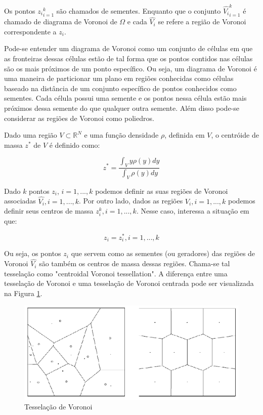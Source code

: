 Os pontos ${z_i}_{i=1}^k$ são chamados de sementes. Enquanto que o conjunto ${\hat{V_i}}_{i=1}^k$ é chamado de diagrama de Voronoi de $\Omega$ e cada $\hat{V_i}$ se refere a região de Voronoi correspondente a $z_i$.

Pode-se entender um diagrama de Voronoi como um conjunto de células em que as fronteiras dessas células estão de tal forma que os pontos contidos nas células são os mais próximos de um ponto específico. Ou seja, um diagrama de Voronoi é uma maneira de particionar um plano em regiões conhecidas como células baseado na distância de um conjunto específico de pontos conhecidos como sementes. Cada célula possui uma semente e os pontos nessa célula estão mais próximos dessa semente do que qualquer outra semente. Além disso pode-se considerar as regiões de Voronoi como poliedros.

Dado uma região $V \subset \mathbb{R}^N$ e uma função densidade $\rho$, definida em $V$, o centróide de massa $z^*$ de $V$ é definido como:

\begin{equation}
    z^* = \frac{\int_V y \rho(y) dy}{\int_V \rho(y) dy}
\end{equation}

Dado $k$ pontos $z_i$, $i=1,...,k$ podemos definir as suas regiões de Voronoi associadas $\hat{V_i},i=1,...,k$. Por outro lado, dados as regiões $\hat{V_i},i=1,...,k$ podemos definir seus centros de massa $z_i^k,i=1,...,k$. Nesse caso, interessa a situação em que:

\begin{equation}
    z_i = z_i^*, i=1,...,k
\end{equation}

Ou seja, os pontos $z_i$ que servem como as sementes (ou geradores) das regiões de Voronoi $\hat{V_i}$ são também os centros de massa dessas regiões. Chama-se tal tesselação como "centroidal Voronoi tessellation". A diferença entre uma tesselação de Voronoi e uma tesselação de Voronoi centrada pode ser visualizada na Figura \ref{fig:voronoi_tessellation}.

\begin{figure}
    \centering
    \includegraphics{fig/voronoi_tessellation.eps}
    \caption[Tesselação de Voronoi]{Tesselação de Voronoi}
    \label{fig:voronoi_tessellation}
\end{figure}


